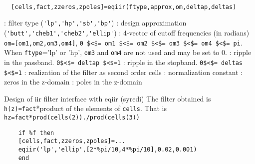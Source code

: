 
\begin{mandesc}
   \\ %
\end{mandesc}
\begin{calling_sequence}
\begin{verbatim}
  [cells,fact,zzeros,zpoles]=eqiir(ftype,approx,om,deltap,deltas)  
\end{verbatim}
\end{calling_sequence}
\begin{parameters}
  \begin{varlist}
    : filter type (\verb!'lp','hp','sb','bp'!)
    : design approximation (\verb!'butt','cheb1','cheb2','ellip'!)
    : 4-vector of cutoff frequencies (in radians)  \verb!om=[om1,om2,om3,om4]!, \verb!0 $<$= om1 $<$= om2 $<$= om3 $<$= om4 $<$= pi!.  When \verb!ftype!='lp' or 'hp', \verb!om3! and \verb!om4! are not used  and may be set to 0.
    : ripple in the passband. \verb!0$<$= deltap $<$=1!
    : ripple in the stopband. \verb!0$<$= deltas $<$=1!
    : realization of the filter as second order cells
    : normalization constant
    : zeros in the z-domain
    : poles in the z-domain
  \end{varlist}
\end{parameters}
\begin{mandescription}
  Design of iir filter interface with eqiir (syredi)
  The filter obtained is \verb!h(z)=fact!*product of the elements of
  \verb!cells!.
  That is \verb!hz=fact*prod(cells(2))./prod(cells(3))!
\end{mandescription}
\begin{examples}
  \begin{Verbatim}
    if %f then
    [cells,fact,zzeros,zpoles]=...
    eqiir('lp','ellip',[2*%pi/10,4*%pi/10],0.02,0.001)
    end
  \end{Verbatim}
\end{examples}
\begin{manseealso}
     
\end{manseealso}
